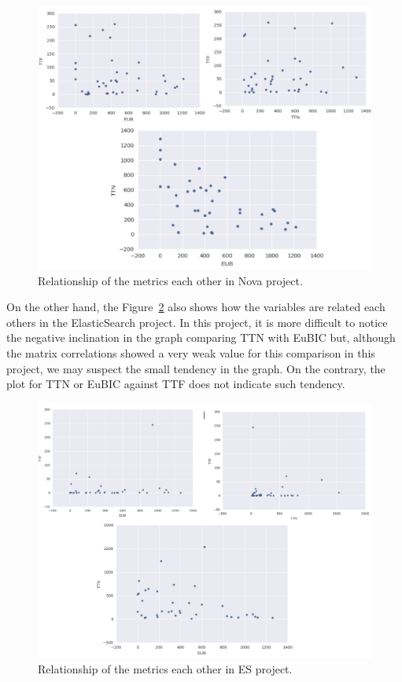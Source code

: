\documentclass[10pt, conference]{IEEEtran}
\begin{document}
\begin{figure}[ht]
\centering
\includegraphics[width=\columnwidth]{DistributionNova_b.png}
\caption{ Relationship of the metrics each other in Nova project.}
\label{fig:graph}       %
\end{figure}

On the other hand, the Figure~\ref{fig:graph1} also shows how the variables are related each others in the ElasticSearch project. In this project, it is more difficult to notice the negative inclination in the graph comparing TTN with EuBIC but, although the matrix correlations showed a very weak value for this comparison in this project, we may suspect the small tendency in the graph. On the contrary, the plot for TTN or EuBIC against TTF does not indicate such tendency.
\begin{figure}[ht]
\centering
\includegraphics[width=\columnwidth]{DistributionES_b.png}
\caption{Relationship of the metrics each other in ES project.}
\label{fig:graph1}       %
\end{figure}
\end{document}
